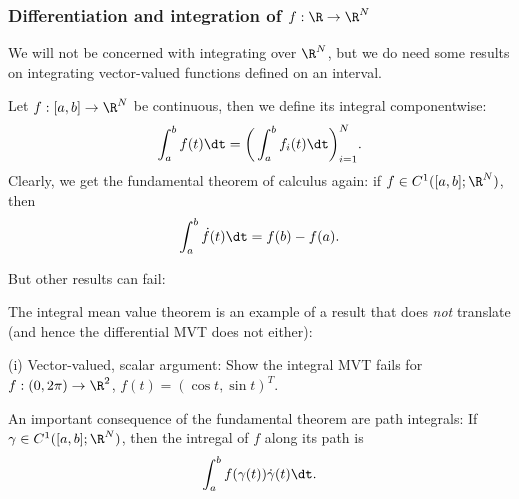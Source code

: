 \subsubsection{Differentiation and integration of $f : \R \to \R^N$}
%
We will not be concerned with integrating over $\R^N$, but we do need
some results on integrating vector-valued functions defined on an
interval.

Let $f : [a, b] \to \R^N$ be continuous, then we define its integral
componentwise:
\begin{displaymath}
  \int_a^b f(t) \dt = \bigg( \int_a^b f_i(t) \dt \bigg)_{i = 1}^N.
\end{displaymath}
Clearly, we get the fundamental theorem of calculus again: if $f \in
C^1([a,b]; \R^N)$, then
\begin{displaymath}
  \int_a^b \dot f(t) \dt = f(b) - f(a).
\end{displaymath}

But other results can fail:

\begin{exercise}
  The integral mean value theorem is an example of a result that does
  {\em not} translate (and hence the differential MVT does not
  either):

  (i) Vector-valued, scalar argument: Show the integral MVT fails for
  $f : (0, 2\pi) \to \R^2$, $f(t) = (\cos t, \sin t)^T$.

\end{exercise}


An important consequence of the fundamental theorem are path
integrals: If $\gamma \in C^1([a, b]; \R^N)$, then the intregal of $f$
along its path is
\begin{displaymath}
  \int_a^b f(\gamma(t)) \dot\gamma(t) \dt.
\end{displaymath}

